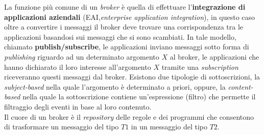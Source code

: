 La funzione più comune di un \emph{broker} è quella di effettuare l'\textbf{integrazione di applicazioni aziendali} (EAI,\emph{enterprise application integration}), in questo caso oltre a convertire i messaggi il broker deve trovare una corrispondenza tra le applicazioni basandosi sui messaggi che si sono scambiati. In tale modello, chiamato \textbf{publish/subscribe}, le applicazioni inviano messaggi sotto forma di \emph{publishing} riguardo ad un determinato argomento $X$ al broker, le applicazioni che hanno dichiarato il loro interesse all'argomento $X$ tramite una \emph{subscription} riceveranno questi messaggi dal broker. Esistono due tipologie di sottoscrizioni, la \emph{subject-based} nella quale l'argomento è determinato a priori, oppure, la \emph{content-based} nella quale la sottoscrizione contiene un'espressione (filtro) che permette il filtraggio degli eventi in base al loro contenuto.\\
Il cuore di un broker è il \emph{repository} delle regole e dei programmi che consentono di trasformare un messaggio del tipo $T1$ in un messaggio del tipo $T2$.
